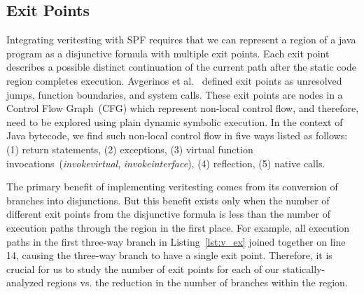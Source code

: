 \subsection{Exit Points}
\label{sec:exit_points}
%
Integrating veritesting with SPF requires that we can represent a region of a java program as a disjunctive formula with multiple exit points.  Each exit point describes a possible distinct continuation of the current path after the static code region completes execution.  Avgerinos et al.~\cite{veritesting} defined exit points as unresolved jumps, function boundaries, and system calls.
%
These exit points are nodes in a Control Flow Graph~(CFG) which represent non-local control flow, and therefore, need to be explored using plain dynamic symbolic execution.
%
In the context of Java bytecode, we find such non-local control flow in five ways listed as follows: (1) return statements, (2) exceptions, (3) virtual function invocations~(\textit{invokevirtual}, \textit{invokeinterface}), (4) reflection, (5) native calls.
%
\iffalse
\mike{These explanations are obvious and can be dispensed with if we need space}
Return statements form the function boundary, and are obvious candidates to be considered as exit points.
%
Exceptions are used to catch unexpected behavior, and often help design of cleaner code, and allow developers to capture useful information when such errors occur.
%
Virtual function invocations occur due to runtime polymorphism supported by Java.
%
The runtime environment binds the method call to its body by using the type of the object making the call.
%
Using reflection requires loading a class at runtime, identifying a method within the class, and calling it.
%
It is primarily used for extensibility purposes, achieving separate compilation, and generating a class at runtime.
\fi
%

%
The primary benefit of implementing veritesting comes from its conversion of branches into disjunctions.
%
But this benefit exists only when the number of different exit points from the disjunctive formula is less than the number of execution paths through the region in the first place.
%
For example, all execution paths in the first three-way branch in
Listing~\ref{lst:v_ex} joined together on line 14, causing the three-way branch to have a single exit point.
%
Therefore, it is crucial for us to study the number of exit points for each of our statically-analyzed regions vs. the reduction in the number of branches within the region.
%
%
%

